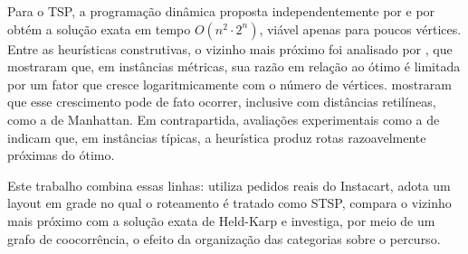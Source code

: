 Para o TSP, a programação dinâmica proposta independentemente por \citet{bellman1962} e por \citet{heldkarp1962} obtém a solução exata em tempo $O(n^2 \cdot 2^n)$, viável apenas para poucos vértices. Entre as heurísticas construtivas, o vizinho mais próximo foi analisado por \citet{rosenkrantz1977}, que mostraram que, em instâncias métricas, sua razão em relação ao ótimo é limitada por um fator que cresce logaritmicamente com o número de vértices. \citet{hougardy2015} mostraram que esse crescimento pode de fato ocorrer, inclusive com distâncias retilíneas, como a de Manhattan. Em contrapartida, avaliações experimentais como a de \citet{johnson1997} indicam que, em instâncias típicas, a heurística produz rotas razoavelmente próximas do ótimo.

Este trabalho combina essas linhas: utiliza pedidos reais do Instacart, adota um layout em grade no qual o roteamento é tratado como STSP, compara o vizinho mais próximo com a solução exata de Held-Karp e investiga, por meio de um grafo de coocorrência, o efeito da organização das categorias sobre o percurso.
